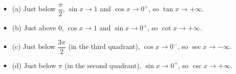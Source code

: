 \begin{itemize}
\item (a) Just below $\dfrac\pi2$, $\sin x\to1$ and $\cos x\to0^+$, so $\tan x\to\boxed{+\infty}$.
\item (b) Just above $0$, $\cos x\to1$ and $\sin x\to0^+$, so $\cot x\to\boxed{+\infty}$.
\item (c) Just below $\dfrac{3\pi}{2}$ (in the third quadrant), $\cos x\to0^-$, so $\sec x\to\boxed{-\infty}$.
\item (d) Just below $\pi$ (in the second quadrant), $\sin x\to0^+$, so $\csc x\to\boxed{+\infty}$.
\end{itemize}
